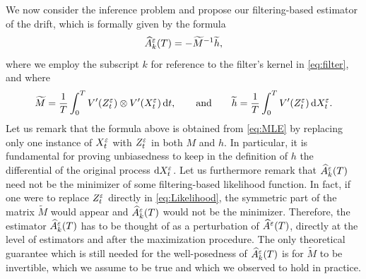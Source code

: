 \documentclass[10pt]{article}
\begin{document}
We now consider the inference problem and propose our filtering-based estimator of the drift, which is formally given by the formula
\begin{equation}\label{eq:AHatMixed}
	\widehat A^\varepsilon_k(T) = - \widetilde M^{-1} \widetilde h,
\end{equation}
where we employ the subscript $k$ for reference to the filter's kernel in \eqref{eq:filter}, and where
\begin{equation}\label{eq:MandHTilde}
	\widetilde M = \frac{1}{T} \int_0^T V'(Z^\varepsilon_t) \otimes V'(X^\varepsilon_t) \,\mathrm{d} t, \qquad \text{and} \qquad \widetilde h = \frac{1}{T} \int_0^T V'(Z^\varepsilon_t) \,\mathrm{d} X^\varepsilon_t.
\end{equation}
Let us remark that the formula above is obtained from \eqref{eq:MLE} by replacing only one instance of $X_t^\varepsilon$ with $Z_t^\varepsilon$ in both $M$ and $h$. In particular, it is fundamental for proving unbiasedness to keep in the definition of $h$ the differential of the original process $\mathrm{d} X^\varepsilon_t$. Let us furthermore remark that $\widehat A^\varepsilon_k(T)$ need not be the minimizer of some filtering-based likelihood function. In fact, if one were to replace $Z_t^\varepsilon$ directly in \eqref{eq:Likelihood}, the symmetric part of the matrix $\widetilde M$ would appear and $\widehat A^\varepsilon_k(T)$ would not be the minimizer. Therefore, the estimator $\widehat A^\varepsilon_k(T)$ has to be thought of as a perturbation of $\widehat A^\varepsilon(T)$, directly at the level of estimators and after the maximization procedure. The only theoretical guarantee which is still needed for the well-posedness of $\widehat A^\varepsilon_k(T)$ is for $\widetilde M$ to be invertible, which we assume to be true and which we observed to hold in practice.

\end{document}
